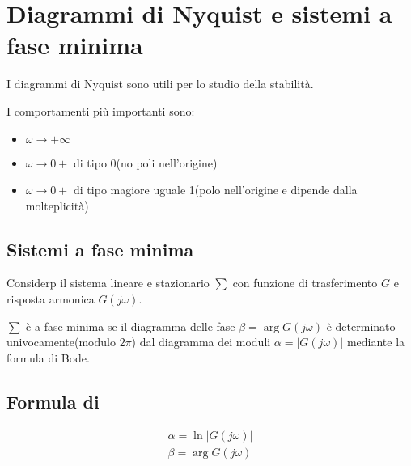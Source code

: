 \chapter{Diagrammi di Nyquist e sistemi a fase minima}


I diagrammi di Nyquist sono utili per lo studio della stabilit\`a.

I comportamenti pi\`u importanti sono:
\begin{itemize}
  \item $\omega \rightarrow +\infty$
  \item $\omega \rightarrow 0+$ di tipo 0(no poli nell'origine)
  \item $\omega \rightarrow 0+$ di tipo  magiore uguale 1(polo nell'origine e dipende dalla molteplicit\`a)
\end{itemize}


\section{Sistemi a fase minima}
Considerp il sistema lineare e stazionario $\sum$ con funzione di trasferimento $G$ 
e risposta armonica $G(j\omega)$.


$\sum$ \`e a fase minima se il diagramma delle fase $\beta = \arg G(j\omega)$ \`e determinato 
univocamente(modulo $2\pi$) dal diagramma dei moduli $\alpha = |G(j\omega)|$ mediante la formula di Bode.







\section{Formula di}
\begin{align}
  \alpha = \ln |G(j\omega)| \\
  \beta = \arg G(j\omega)
\end{align}




